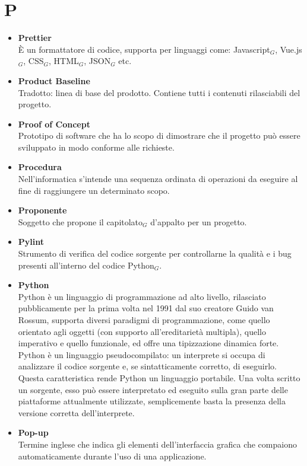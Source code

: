 \chapter{P} \label{P}
	\begin{itemize}
		\item \textbf{Prettier} \\
		È un formattatore di codice, supporta per linguaggi come: Javascript$_G$, Vue.js$_G$, CSS$_G$, HTML$_G$, JSON$_G$ etc.

		\item \textbf{Product Baseline}\\
		Tradotto: linea di base del prodotto.
		Contiene tutti i contenuti rilasciabili del progetto.

		\item \textbf{Proof of Concept}\\
		Prototipo di software che ha lo scopo di dimostrare che il progetto può essere sviluppato in modo conforme alle richieste.

		\item \textbf{Procedura}\\
		Nell'informatica s'intende una sequenza ordinata di operazioni da eseguire al fine di raggiungere un determinato scopo.

		\item \textbf{Proponente}\\
		Soggetto che propone il capitolato$_G$ d'appalto per un progetto.

		\item \textbf{Pylint} \\
		Strumento di verifica del codice sorgente per controllarne la qualità e i bug presenti all'interno del codice Python$_G$.

		\item \textbf{Python}\\
		Python è un linguaggio di programmazione ad alto livello, rilasciato pubblicamente per la prima volta nel 1991 dal suo creatore Guido van Rossum, supporta diversi paradigmi di programmazione, come quello orientato agli oggetti (con supporto all'ereditarietà multipla), quello imperativo e quello funzionale, ed offre una tipizzazione dinamica forte.
		Python è un linguaggio pseudocompilato: un interprete si occupa di analizzare il codice sorgente e, se sintatticamente corretto, di eseguirlo. Questa caratteristica rende Python un linguaggio portabile. Una volta scritto un sorgente, esso può essere interpretato ed eseguito sulla gran parte delle piattaforme attualmente utilizzate, semplicemente basta la presenza della versione corretta dell’interprete.

		\item \textbf{Pop-up}\\
		Termine inglese che indica gli elementi dell'interfaccia grafica che compaiono automaticamente durante l'uso di una applicazione.
	\end{itemize}
